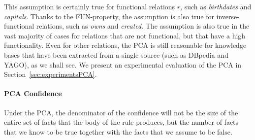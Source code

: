 This assumption is certainly true for functional relations $r$, such as \emph{birthdates} and \emph{capitals}.
Thanks to the FUN-property, the assumption is also true for inverse-functional relations, such as \emph{owns} and \emph{created}.
The assumption is also true in the vast majority of cases for relations that are not functional, but that have a high functionality. 
Even for other relations, the PCA is still reasonable for knowledge bases that have been extracted from a single source (such as DBpedia and YAGO), as we shall see. 
We present an experimental evaluation of the PCA in Section~\ref{sec:experimentsPCA}.




\paragraph{PCA Confidence} 
\label{pcaConf}
Under the PCA, the denominator of the confidence will not be the size of the entire set of facts that the body of the rule produces, 
but the number of facts that we know to be true together with the facts that we assume to be false. 

